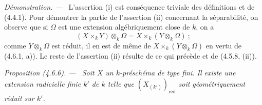 \documentclass[10pt,oneside]{book}
\newenvironment{proposition}[1][]{%
  \par\medskip\noindent\itshape Proposition (#1). ---\ }{\par}
\newenvironment{proof}{%
  \par\medskip\noindent\textit{Démonstration. ---\ }}{\par}
\begin{document}
\begin{proof}
L'assertion (i) est conséquence triviale des définitions et de (4.4.1). Pour
démontrer la partie de l'assertion (ii) concernant la séparabilité, on observe
que si $\Omega$ est une extension algébriquement close de $k$, on a
\[
(X\times_k Y)\otimes_k\Omega=X\times_k(Y\otimes_k\Omega)~;
\]
comme $Y\otimes_k\Omega$ est réduit, il en est de même de
$X\times_k(Y\otimes_k\Omega)$ en vertu de (4.6.1, a)). Le reste de l'assertion
(ii) résulte de ce qui précède et de (4.5.8, (ii)).
\end{proof}

\begin{proposition}[4.6.6]
\label{IV.2.4.6.6-fr}
Soit $X$ un $k$-préschéma de type fini. Il existe une extension radicielle finie
$k'$ de $k$ telle que $(X_{(k')})_{\mathrm{red}}$ soit géométriquement réduit
sur $k'$.
\end{proposition}
\end{document}

